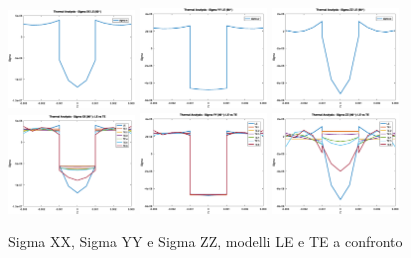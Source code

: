 \documentclass{article}
\begin{document}
            \begin{figure}[h!]
                \centering
                 \label{fig:sigmas_thermal_90}
                \includegraphics[width=0.3\textwidth]{MUL2/Esercitazione3/MUL2_FEM/OUTPUT/PLOT/thermal_XX_LE_90.svg.eps}
                \includegraphics[width=0.3\textwidth]{MUL2/Esercitazione3/MUL2_FEM/OUTPUT/PLOT/thermal_YY_LE_90.svg.eps}
                \includegraphics[width=0.3\textwidth]{MUL2/Esercitazione3/MUL2_FEM/OUTPUT/PLOT/thermal_ZZ_LE_90.svg.eps}
                \includegraphics[width=0.3\textwidth]{MUL2/Esercitazione3/MUL2_FEM/OUTPUT/PLOT/thermal_XX_LEvsTE_90.svg.eps}
                \includegraphics[width=0.3\textwidth]{MUL2/Esercitazione3/MUL2_FEM/OUTPUT/PLOT/thermal_YY_LEvsTE_90.svg.eps}
                \includegraphics[width=0.3\textwidth]{MUL2/Esercitazione3/MUL2_FEM/OUTPUT/PLOT/thermal_ZZ_LEvsTE_90.svg.eps}
                \caption{Sigma XX, Sigma YY e Sigma ZZ, modelli LE e TE a confronto}
            \end{figure}
\end{document}
